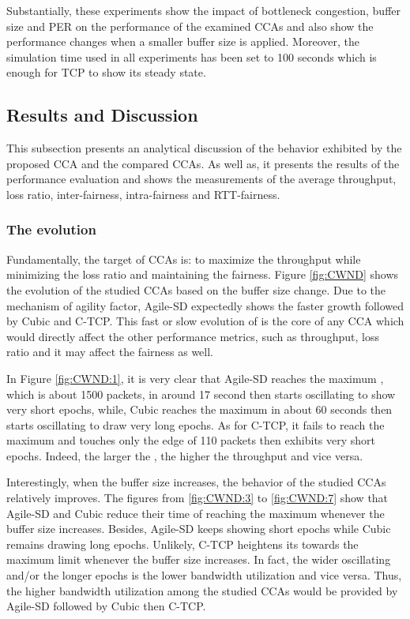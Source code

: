 \documentclass[preprint,3p,times,twocolumn,authoryear]{elsarticle}
\begin{document}
Substantially, these experiments show the impact of bottleneck congestion, buffer size and PER on the performance of the examined CCAs and also show the performance changes when a smaller buffer size is applied. Moreover, the simulation time used in all experiments has been set to 100 seconds which is enough for TCP to show its steady state.

\subsection{Results and Discussion}

This subsection presents an analytical discussion of the behavior exhibited by the proposed CCA and the compared CCAs. As well as, it presents the results of the performance evaluation and shows the measurements of the average throughput, loss ratio, inter-fairness, intra-fairness and RTT-fairness.

\subsubsection{The  evolution}
Fundamentally, the target of CCAs is: to maximize the throughput while minimizing the loss ratio and maintaining the fairness. Figure \ref{fig:CWND} shows the  evolution of the studied CCAs based on the buffer size change. Due to the mechanism of agility factor, Agile-SD expectedly shows the faster  growth followed by Cubic and C-TCP. This fast or slow evolution of  is the core of any CCA which would directly affect the other performance metrics, such as throughput, loss ratio and it may affect the fairness as well.

In Figure \ref{fig:CWND:1}, it is very clear that Agile-SD reaches the maximum , which is about 1500 packets, in around 17 second then starts oscillating to show very short epochs, while, Cubic reaches the maximum  in about 60 seconds then starts oscillating to draw very long epochs. As for C-TCP, it fails to reach the maximum  and touches only the edge of 110 packets then exhibits very short epochs. Indeed, the larger the , the higher the throughput and vice versa.

Interestingly, when the buffer size increases, the behavior of the studied CCAs relatively improves. The figures from \ref{fig:CWND:3} to \ref{fig:CWND:7} show that Agile-SD and Cubic reduce their time of reaching the maximum  whenever the buffer size increases. Besides, Agile-SD keeps showing short epochs while Cubic remains drawing long epochs. Unlikely, C-TCP heightens its  towards the maximum limit whenever the buffer size increases. In fact, the wider oscillating and/or the longer epochs is the lower bandwidth utilization and vice versa. Thus, the higher bandwidth utilization among the studied CCAs would be provided by Agile-SD followed by Cubic then C-TCP.
\end{document}
